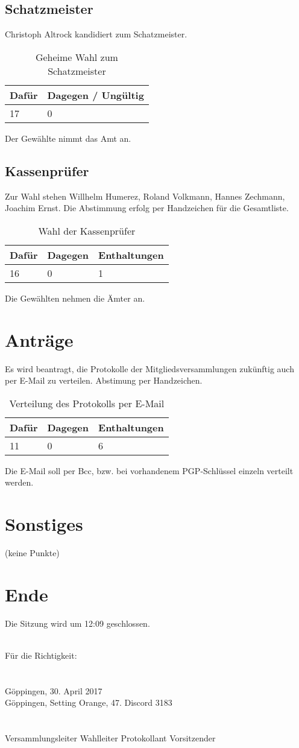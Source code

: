 \documentclass[a4paper]{scrartcl}
\begin{document}
\subsection{Schatzmeister}
Christoph Altrock kandidiert zum Schatzmeister.
\begin{table}[H]
	\begin{tabularx}{\textwidth}{XX}
		Dafür & Dagegen / Ungültig\\
		\toprule
		17 & 0\\
	\end{tabularx}
	\caption{Geheime Wahl zum Schatzmeister}
\end{table}
Der Gewählte nimmt das Amt an.
\subsection{Kassenprüfer}
Zur Wahl stehen Willhelm Humerez, Roland Volkmann, Hannes Zechmann, Joachim Ernst. Die Abstimmung erfolg per Handzeichen für die Gesamtliste.
\begin{table}[H]
	\begin{tabularx}{\textwidth}{XXX}
		Dafür & Dagegen & Enthaltungen\\
		\toprule
		16 & 0 & 1\\
	\end{tabularx}
	\caption{Wahl der Kassenprüfer}
\end{table}
Die Gewählten nehmen die Ämter an.
\clearpage
\section{Anträge}
Es wird beantragt, die Protokolle der Mitgliedsversammlungen zukünftig auch per E-Mail zu verteilen. Abstimung per Handzeichen.\\
\begin{table}[H]
	\begin{tabularx}{\textwidth}{XXX}
		Dafür & Dagegen & Enthaltungen\\
		\toprule
		11 & 0 & 6\\
	\end{tabularx}
	\caption{Verteilung des Protokolls per E-Mail}
\end{table}
Die E-Mail soll per Bcc, bzw. bei vorhandenem PGP-Schlüssel einzeln verteilt werden.

\section{Sonstiges}

(keine Punkte)\\

\section{Ende}

Die Sitzung wird um 12:09 geschlossen.

\vfill
\mbox{}\\
Für die Richtigkeit:\\
\\
\\
Göppingen, 30. April 2017\\
Göppingen, Setting Orange, 47. Discord 3183 \\
\\
\\
\hfill Versammlungsleiter \hfill Wahlleiter \hfill Protokollant \hfill Vorsitzender \hfill
\end{document}
